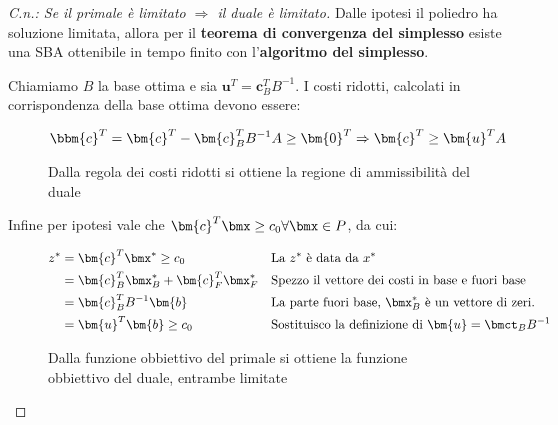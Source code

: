 \documentclass[\main/main.tex]{subfiles}
\begin{document}
\begin{proof}[C.n.: Se il primale è limitato $\Rightarrow$ il duale è limitato]

  Dalle ipotesi il poliedro ha soluzione limitata, allora per il \textbf{teorema di convergenza del simplesso} esiste una SBA ottenibile in tempo finito con l'\textbf{algoritmo del simplesso}.

  Chiamiamo $B$ la base ottima e sia $\bm{u}^T = \bm{c}^T_B B^{-1}$. I costi ridotti, calcolati in corrispondenza della base ottima devono essere:

  \begin{figure}
    \[
      \bbm{c}^T = \bm{c}^T - \bm{c}_B^TB^{-1}A \geq \bm{0}^T \Rightarrow \bm{c}^T \geq \bm{u}^TA
    \]
    \caption{Dalla regola dei costi ridotti si ottiene la regione di ammissibilità del duale}
  \end{figure}

  Infine per ipotesi vale che $\bm{c}^T \bmx \geq c_0 \forall \bmx \in P$, da cui:

  \begin{figure}
    \begin{align*}
      z^* & = \bm{c}^T\bmx^* \geq c_0                   &  & \text{La $z^*$ è data da $x^*$}                                \\
          & = \bm{c}_B^T \bmx^*_B + \bm{c}_F^T \bmx^*_F &  & \text{Spezzo il vettore dei costi in base e fuori base}        \\
          & = \bm{c}_B^TB^{-1}\bm{b}                    &  & \text{La parte fuori base, $\bmx^*_B$ è un vettore di zeri.}   \\
          & = \bm{u}^T\bm{b}  \geq c_0                  &  & \text{Sostituisco la definizione di $\bm{u} = \bmct_B B^{-1}$}
    \end{align*}
    \caption{Dalla funzione obbiettivo del primale si ottiene la funzione obbiettivo del duale, entrambe limitate}
  \end{figure}

\end{proof}
\end{document}
